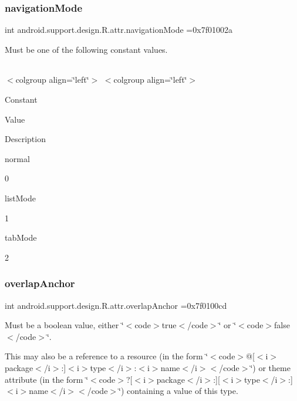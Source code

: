 \subsubsection{\texorpdfstring{navigation\+Mode}{navigationMode}}
{\footnotesize\ttfamily int android.\+support.\+design.\+R.\+attr.\+navigation\+Mode =0x7f01002a\hspace{0.3cm}{\ttfamily [static]}}

Must be one of the following constant values.

\tabulinesep=1mm
\begin{longtabu} spread 0pt [c]{*{0}{|X[-1]}|}
\hline
\end{longtabu}
$<$colgroup align=\char`\"{}left\char`\"{}$>$ $<$colgroup align=\char`\"{}left\char`\"{}$>$ 

Constant

Value

Description 

{\ttfamily normal}

0

{\ttfamily list\+Mode}

1

{\ttfamily tab\+Mode}

2\mbox{\label{classandroid_1_1support_1_1design_1_1R_1_1attr_a6431f4eaa762dbbcc2472210e6de4d03}} 
\subsubsection{\texorpdfstring{overlap\+Anchor}{overlapAnchor}}
{\footnotesize\ttfamily int android.\+support.\+design.\+R.\+attr.\+overlap\+Anchor =0x7f0100cd\hspace{0.3cm}{\ttfamily [static]}}

Must be a boolean value, either \char`\"{}$<$code$>$true$<$/code$>$\char`\"{} or \char`\"{}$<$code$>$false$<$/code$>$\char`\"{}. 

This may also be a reference to a resource (in the form \char`\"{}$<$code$>$@\mbox{[}$<$i$>$package$<$/i$>$\+:\mbox{]}$<$i$>$type$<$/i$>$\+:$<$i$>$name$<$/i$>$$<$/code$>$\char`\"{}) or theme attribute (in the form \char`\"{}$<$code$>$?\mbox{[}$<$i$>$package$<$/i$>$\+:\mbox{]}\mbox{[}$<$i$>$type$<$/i$>$\+:\mbox{]}$<$i$>$name$<$/i$>$$<$/code$>$\char`\"{}) containing a value of this type. \mbox{\label{classandroid_1_1support_1_1design_1_1R_1_1attr_ae87ba13c61369d6cb142278630e1ae38}} 
